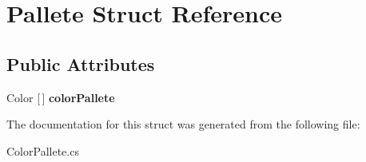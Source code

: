 \hypertarget{struct_pallete}{}\section{Pallete Struct Reference}
\label{struct_pallete}
\subsection*{Public Attributes}
\begin{DoxyCompactItemize}
\item 
\mbox{\label{struct_pallete_a3ea2b6f82cfdb219a82bdf5239fd9f08}} 
Color \mbox{[}$\,$\mbox{]} {\bfseries color\+Pallete}
\end{DoxyCompactItemize}


The documentation for this struct was generated from the following file\+:\begin{DoxyCompactItemize}
\item 
Color\+Pallete.\+cs\end{DoxyCompactItemize}
